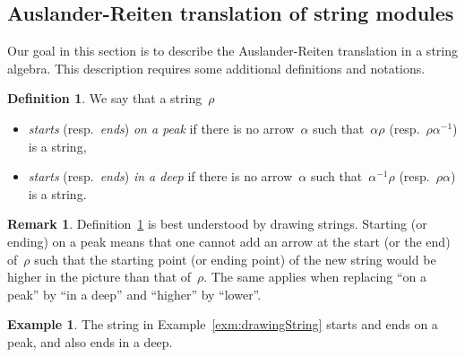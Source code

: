 \documentclass{amsart}
\theoremstyle{definition}
\newtheorem{definition}[theorem]{Definition}
\newtheorem{example}[theorem]{Example}
\newtheorem{remark}[theorem]{Remark}
\newcommand{\darkblue}{\color{darkblue}} %
\newcommand{\defn}[1]{\textsl{\darkblue #1}} %
\begin{document}
\subsection{Auslander-Reiten translation of string modules}
\label{subsec:ARtranslationStringModules}

Our goal in this section is to describe the Auslander-Reiten translation in a string algebra.
This description requires some additional definitions and notations.

\begin{definition}
\label{def:peaksDeeps}
We say that a string~$\rho$
  \begin{itemize}
    \item \defn{starts} (resp.~\defn{ends}) \defn{on a peak} if there is no arrow~$\alpha$ such that~$\alpha \rho$ (resp.~$\rho\alpha^{-1}$) is a string,
    \item \defn{starts} (resp.~\defn{ends}) \defn{in a deep} if there is no arrow~$\alpha$ such that~$\alpha^{-1} \rho$ (resp.~$\rho \alpha$) is a string.
  \end{itemize}
\end{definition} 

\begin{remark}
Definition~\ref{def:peaksDeeps} is best understood by drawing strings.  Starting (or ending) on a peak means that one cannot add an arrow at the start (or the end) of~$\rho$ such that the starting point (or ending point) of the new string would be higher in the picture than that of~$\rho$.  The same applies when replacing ``on a peak'' by ``in a deep'' and  ``higher'' by ``lower''.
\end{remark}

\begin{example}
The string in Example~\ref{exm:drawingString} starts and ends on a peak, and also ends in a deep.
\end{example}
\end{document}
